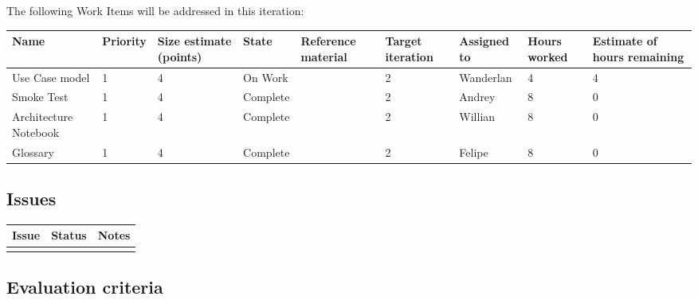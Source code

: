 The following Work Items will be addressed in this iteration:

\begin{adjustbox}{width=\textwidth}
\noindent\begin{tabular}{|l|l|l|l|l|l|l|l|l|}
\hline
Name & Priority & Size estimate (points) & State & Reference material & Target iteration & Assigned to & Hours worked & Estimate of hours remaining \\ \hline
Use Case model & 1 & 4 & On Work & & 2 & Wanderlan & 4 & 4 \\ \hline
Smoke Test & 1 & 4 & Complete & & 2 & Andrey & 8 & 0 \\ \hline
Architecture Notebook & 1 & 4 & Complete & & 2 & Willian & 8 & 0 \\ \hline
Glossary & 1 & 4 & Complete & & 2 & Felipe & 8 & 0 \\ \hline
\end{tabular}
\end{adjustbox}

\subsection*{Issues}


\noindent\begin{tabular}{|l|l|l|}
\hline
Issue & Status & Notes \\
\hline
 &  & \\
\hline
\end{tabular}

\subsection*{Evaluation criteria}



